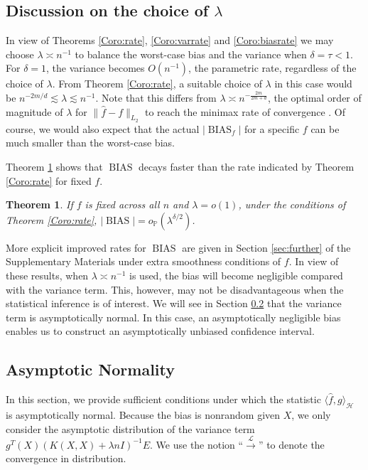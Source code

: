 \documentclass[12pt]{article}
\theoremstyle{plain}
\newtheorem{theorem}{Theorem}
\theoremstyle{remark}
\begin{document}
\subsection{Discussion on the choice of $\lambda$}

In view of Theorems \ref{Coro:rate}, \ref{Coro:varrate} and \ref{Coro:biasrate} we may choose  $\lambda\asymp n^{-1}$ to balance the worst-case bias and the variance  when $\delta=\tau<1$. For $\delta=1$, the variance becomes $O(n^{-1})$, the parametric rate, regardless of the choice of $\lambda$. From Theorem \ref{Coro:rate}, a suitable choice of $\lambda$ in this case would be $n^{-{2m}/d}\lesssim\lambda\lesssim n^{-1}$. 
Note that this differs from $\lambda\asymp n^{-\frac{2m}{2m+d}}$,  the optimal order of magnitude of $\lambda$ for $\|\hat{f}-f\|_{L_2}$ to reach the minimax rate of convergence \citep{Stone80}.
Of course, we would also expect that the actual $|\operatorname{BIAS}_f|$ for a specific $f$ can be much smaller than the worst-case bias. 

Theorem \ref{Th:oBIAS} shows that $\operatorname{BIAS}$ decays faster than the rate indicated by Theorem \ref{Coro:rate} for fixed $f$.
\begin{theorem}\label{Th:oBIAS}
    If $f$ is fixed across all $n$ and $\lambda=o(1)$, under the conditions of Theorem \ref{Coro:rate}, $|\operatorname{BIAS}|=o_\mathbb{P}(\lambda^{\delta/2})$.
\end{theorem}


More explicit improved rates for $\operatorname{BIAS}$ are given in Section \ref{sec:further} of the Supplementary Materials under extra smoothness conditions of $f$. In view of these results, when $\lambda\asymp n^{-1}$ is used, the bias will become negligible compared with the variance term. This, however, may not be disadvantageous when the statistical inference is of interest. We will see in Section \ref{sec:AN} that the variance term is asymptotically normal. In this case, an asymptotically negligible bias enables us to construct an asymptotically unbiased confidence interval.





\subsection{Asymptotic Normality}\label{sec:AN}

In this section, we provide sufficient conditions under which the statistic $\langle \hat{f},g\rangle_\mathcal{H}$ is asymptotically normal. Because the bias is nonrandom given $X$, we only consider the asymptotic distribution of the variance term $g^T(X)(K(X,X)+\lambda n I)^{-1}E$. 
We use the notion ``$\xrightarrow{\mathscr{L}}$'' to denote the convergence in distribution.
\end{document}
